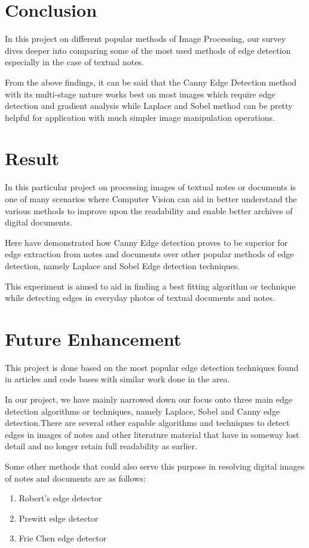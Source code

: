 \documentclass[BTech]{srmuthesis}
\begin{document}
\chapter{Conclusion}
In this project on different popular methods of Image Processing, our survey dives deeper into comparing some of the most used methods of edge detection especially in the case of textual notes. 

From the above findings, it can be said that the Canny Edge Detection method with its multi-stage nature works best on most images which require edge detection and gradient analysis while Laplace and Sobel method can be pretty helpful for application with much simpler image manipulation operations.

\chapter{Result}
In this particular project on processing images of textual notes or documents is one of many scenarios where Computer Vision can aid in better understand the various methods to improve upon the readability and enable better archives of digital documents. 


Here have demonstrated how Canny Edge detection proves to be superior for edge extraction from notes and documents over other popular methods of edge detection, namely Laplace and Sobel Edge detection techniques. 

This experiment is aimed to aid in finding a best fitting algorithm or technique while detecting edges in everyday photos of textual documents and notes.

\chapter{Future Enhancement}
This project is done based on the most popular edge detection techniques found in articles and code bases with similar work done in the area.

In our project, we have mainly narrowed down our focus onto three main edge detection algorithms or techniques, namely Laplace, Sobel and Canny edge detection.There are several other capable algorithms and techniques to detect edges in images of notes and other literature material that have in someway lost detail and no longer retain full readability as earlier.

Some other methods that could also serve this purpose in resolving digital images of notes and documents are as follows:
\begin{enumerate}
    \item Robert's edge detector
    \item Prewitt edge detector
    \item Frie Chen edge detector
\end{enumerate}
\end{document}
